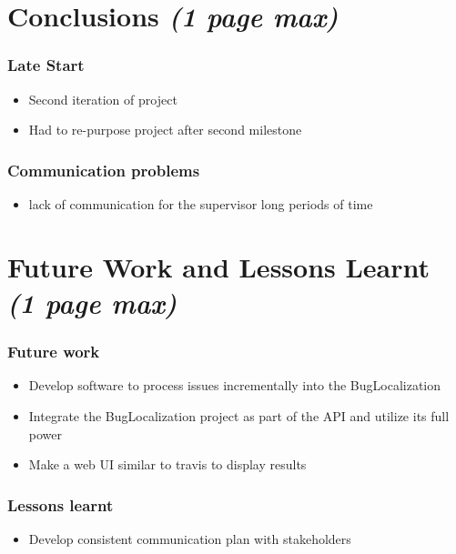 \documentclass[12pt]{article}
\begin{document}
\section{\texorpdfstring{Conclusions \emph{(1 page
max)}}{Conclusions (1 page max)}}\label{conclusions-1-page-max}

\subsubsection{Late Start}\label{late-start}

\begin{itemize}
\tightlist
\item
  Second iteration of project
\item
  Had to re-purpose project after second milestone
\end{itemize}

\subsubsection{Communication problems}\label{communication-problems}

\begin{itemize}
\tightlist
\item
  lack of communication for the supervisor long periods of time
\end{itemize}

\section{\texorpdfstring{Future Work and Lessons Learnt \emph{(1 page
max)}}{Future Work and Lessons Learnt (1 page max)}}\label{future-work-and-lessons-learnt-1-page-max}

\subsubsection{Future work}\label{future-work}

\begin{itemize}
\tightlist
\item
  Develop software to process issues incrementally into the
  BugLocalization
\item
  Integrate the BugLocalization project as part of the API and utilize
  its full power
\item
  Make a web UI similar to travis to display results
\end{itemize}

\subsubsection{Lessons learnt}\label{lessons-learnt}

\begin{itemize}
\tightlist
\item
  Develop consistent communication plan with stakeholders
\end{itemize}



\end{document}
